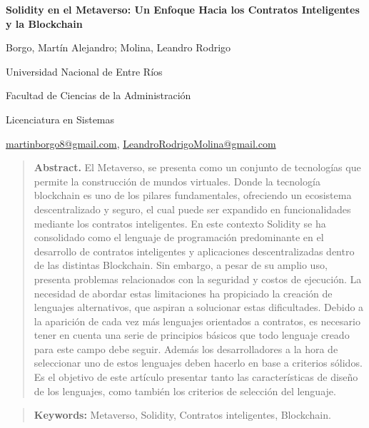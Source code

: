 \documentclass[a4paper,10pt]{article}
\begin{document}
	\pagestyle{empty}
	\begin{titlepage}
		\centering
		\vspace*{1.5cm}
		{\fontsize{14}{17}\bfseries Solidity en el Metaverso: Un Enfoque Hacia los Contratos Inteligentes y la Blockchain\par}
		{\small Borgo, Martín Alejandro; Molina, Leandro Rodrigo\par}
		{\normalsize Universidad Nacional de Entre Ríos\par}
		{\normalsize Facultad de Ciencias de la Administración\par}
		{\normalsize Licenciatura en Sistemas \par}
		{\small \href{mailto:martinborgo8@gmail.com}{martinborgo8@gmail.com}, \href{mailto:LeandroRodrigoMolina@gmail.com}{LeandroRodrigoMolina@gmail.com}\par}
		
		{\small \justify \begin{quote}\textbf{Abstract.} El Metaverso, se presenta como un conjunto de tecnologías que permite la construcción de mundos virtuales. Donde la tecnología blockchain es uno de los pilares fundamentales, ofreciendo un ecosistema descentralizado y seguro, el cual puede ser expandido en funcionalidades mediante los contratos inteligentes. En este contexto Solidity se ha consolidado como el lenguaje de programación predominante en el desarrollo de contratos inteligentes y aplicaciones descentralizadas dentro de las distintas Blockchain. Sin embargo, a pesar de su amplio uso, presenta problemas relacionados con la seguridad y costos de ejecución. La necesidad de abordar estas limitaciones ha propiciado la creación de lenguajes alternativos, que aspiran a solucionar estas dificultades. Debido a la aparición de cada vez más lenguajes orientados a contratos, es necesario tener en cuenta una serie de principios básicos que todo lenguaje creado para este campo debe seguir. Además los desarrolladores a la hora de seleccionar uno de estos lenguajes deben hacerlo en base a criterios sólidos. Es el objetivo de este artículo presentar tanto las características de diseño de los lenguajes, como también los criterios de selección del lenguaje. \end{quote} \par}
		{\small \justify \begin{quote} \textbf{Keywords:} Metaverso, Solidity, Contratos inteligentes, Blockchain. \end{quote} \par}
	\end{titlepage}
	
\end{document}
